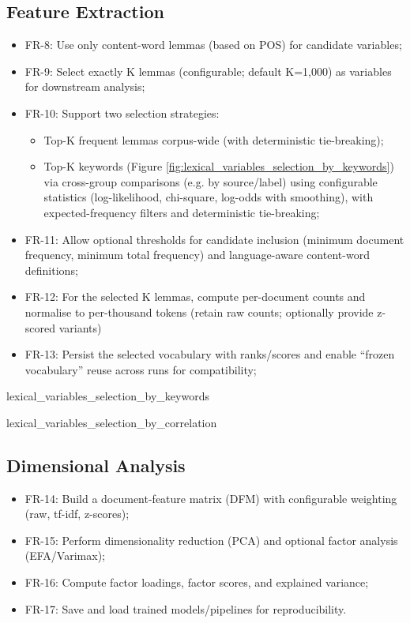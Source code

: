 \subsection{Feature Extraction}
\begin{itemize}
    \item FR-8: Use only content-word lemmas (based on POS) for candidate variables;
    \item FR-9: Select exactly K lemmas (configurable; default K=1,000) as variables for downstream analysis;
    \item FR-10: Support two selection strategies:
    \begin{itemize}
        \item Top-K frequent lemmas corpus-wide (with deterministic tie-breaking);
        \item Top-K keywords (Figure \ref{fig:lexical_variables_selection_by_keywords}) via cross-group comparisons (e.g. by source/label) using configurable statistics (log-likelihood, chi-square, log-odds with smoothing), with expected-frequency filters and deterministic tie-breaking;
    \end{itemize}
    \item FR-11: Allow optional thresholds for candidate inclusion (minimum document frequency, minimum total frequency) and language-aware content-word definitions;
    \item FR-12: For the selected K lemmas, compute per-document counts and normalise to per-thousand tokens (retain raw counts; optionally provide z-scored variants)
    \item FR-13: Persist the selected vocabulary with ranks/scores and enable ``frozen vocabulary'' reuse across runs for compatibility;
\end{itemize}

{lexical_variables_selection_by_keywords}

{lexical_variables_selection_by_correlation}

\subsection{Dimensional Analysis}
\begin{itemize}
    \item FR-14: Build a document-feature matrix (DFM) with configurable weighting (raw, tf-idf, z-scores);
    \item FR-15: Perform dimensionality reduction (PCA) and optional factor analysis (EFA/Varimax);
    \item FR-16: Compute factor loadings, factor scores, and explained variance;
    \item FR-17: Save and load trained models/pipelines for reproducibility.
\end{itemize}

